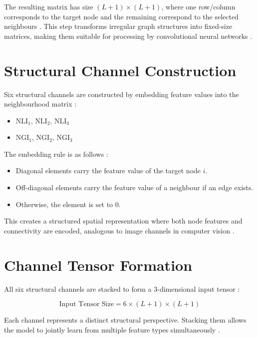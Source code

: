 The resulting matrix has size $(L+1) \times (L+1)$, where one 
row/column corresponds to the target node and the remaining correspond 
to the selected neighbours \cite{guo2026}. This step transforms 
irregular graph structures into fixed-size matrices, making them 
suitable for processing by convolutional neural networks \cite{tu2025, 
patel2025}.

\section{Structural Channel Construction}

Six structural channels are constructed by embedding feature values 
into the neighbourhood matrix \cite{guo2026}:
\begin{itemize}
    \item $\text{NLI}_1$, $\text{NLI}_2$, $\text{NLI}_3$
    \item $\text{NGI}_1$, $\text{NGI}_2$, $\text{NGI}_3$
\end{itemize}

The embedding rule is as follows \cite{guo2026}:
\begin{itemize}
    \item Diagonal elements carry the feature value of the target 
    node $i$.
    \item Off-diagonal elements carry the feature value of a neighbour 
    if an edge exists.
    \item Otherwise, the element is set to $0$.
\end{itemize}

This creates a structured spatial representation where both node 
features and connectivity are encoded, analogous to image channels 
in computer vision \cite{tu2025}.

\section{Channel Tensor Formation}

All six structural channels are stacked to form a 3-dimensional 
input tensor \cite{guo2026}:

\begin{equation}
\text{Input Tensor Size} = 6 \times (L+1) \times (L+1)
\end{equation}

Each channel represents a distinct structural perspective. Stacking 
them allows the model to jointly learn from multiple feature types 
simultaneously \cite{tu2025, zhang2019gcn}.

